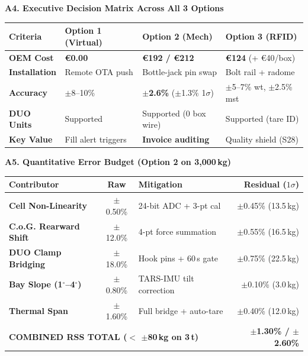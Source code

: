 \documentclass[10pt,a4paper]{article}
\begin{document}
\begin{minipage}[t]{0.485\textwidth}
  \begin{tcolorbox}[colback=white, colframe=bordergray, arc=3pt, boxsep=2pt, left=4pt, right=4pt, top=3pt, bottom=3pt]
  {\fontsize{7.2pt}{8.2pt}\selectfont \textbf{\color{europressred}A4. Executive Decision Matrix Across All 3 Options}}\\[2pt]
  {\fontsize{6.4pt}{7.6pt}\selectfont
  \begin{tabularx}{\textwidth}{l p{1.6cm} p{1.7cm} X}
  \toprule
  \textbf{Criteria} & \textbf{Option 1 (Virtual)} & \textbf{Option 2 (Mech)} & \textbf{Option 3 (RFID)} \\
  \midrule
  \textbf{OEM Cost} & \textbf{\euro{}0.00} & \textbf{\euro{}192 / \euro{}212} & \textbf{\euro{}124} (+ \euro{}40/box) \\
  \textbf{Installation} & Remote OTA push & Bottle-jack pin swap & Bolt rail + radome \\
  \textbf{Accuracy} & $\pm$8--10\% & \textbf{$\pm$2.6\%} ($\pm$1.3\% 1$\sigma$) & $\pm$5--7\% wt, $\pm$2.5\% mst \\
  \textbf{DUO Units} & Supported & Supported (0 box wire) & Supported (tare ID) \\
  \textbf{Key Value} & Fill alert triggers & \textbf{Invoice auditing} & Quality shield (S28) \\
  \bottomrule
  \end{tabularx}
  }
  \end{tcolorbox}
\end{minipage}%
\hfill
\begin{minipage}[t]{0.485\textwidth}
  \begin{tcolorbox}[colback=white, colframe=bordergray, arc=3pt, boxsep=2pt, left=4pt, right=4pt, top=3pt, bottom=3pt]
  {\fontsize{7.2pt}{8.2pt}\selectfont \textbf{\color{techblue}A5. Quantitative Error Budget (Option 2 on 3,000\,kg)}}\\[2pt]
  {\fontsize{6.4pt}{7.6pt}\selectfont
  \begin{tabularx}{\textwidth}{l c X r}
  \toprule
  \textbf{Contributor} & \textbf{Raw} & \textbf{Mitigation} & \textbf{Residual ($1\sigma$)} \\
  \midrule
  \textbf{Cell Non-Linearity} & $\pm$0.50\% & 24-bit ADC + 3-pt cal & $\pm$0.45\% (13.5\,kg) \\
  \textbf{C.o.G. Rearward Shift} & $\pm$12.0\% & 4-pt force summation & $\pm$0.55\% (16.5\,kg) \\
  \textbf{DUO Clamp Bridging} & $\pm$18.0\% & Hook pins + 60\,s gate & $\pm$0.75\% (22.5\,kg) \\
  \textbf{Bay Slope (1$^\circ$--4$^\circ$)} & $\pm$0.80\% & TARS-IMU tilt correction & $\pm$0.10\% (3.0\,kg) \\
  \textbf{Thermal Span} & $\pm$1.60\% & Full bridge + auto-tare & $\pm$0.40\% (12.0\,kg) \\
  \midrule
  \multicolumn{3}{l}{\textbf{COMBINED RSS TOTAL ($<$ $\pm$80\,kg on 3\,t)}} & \textbf{$\pm$1.30\% / $\pm$2.60\%} \\
  \bottomrule
  \end{tabularx}
  }
  \end{tcolorbox}
\end{minipage}
\end{document}
